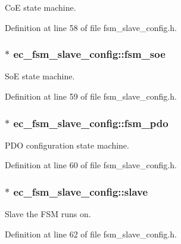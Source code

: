 Co\-E state machine. 



Definition at line 58 of file fsm\-\_\-slave\-\_\-config.\-h.

\subsubsection[{fsm\-\_\-soe}]{$\ast$ ec\-\_\-fsm\-\_\-slave\-\_\-config\-::fsm\-\_\-soe}\label{structec__fsm__slave__config_a5760deffedeccf9457cd5bbf9c8b1706}


So\-E state machine. 



Definition at line 59 of file fsm\-\_\-slave\-\_\-config.\-h.

\subsubsection[{fsm\-\_\-pdo}]{$\ast$ ec\-\_\-fsm\-\_\-slave\-\_\-config\-::fsm\-\_\-pdo}\label{structec__fsm__slave__config_afad3c621c1ca68bcdb3b983cfa1101c0}


P\-D\-O configuration state machine. 



Definition at line 60 of file fsm\-\_\-slave\-\_\-config.\-h.

\subsubsection[{slave}]{$\ast$ ec\-\_\-fsm\-\_\-slave\-\_\-config\-::slave}\label{structec__fsm__slave__config_aa4f0d106474cbddf8159b09049d14398}


Slave the F\-S\-M runs on. 



Definition at line 62 of file fsm\-\_\-slave\-\_\-config.\-h.

